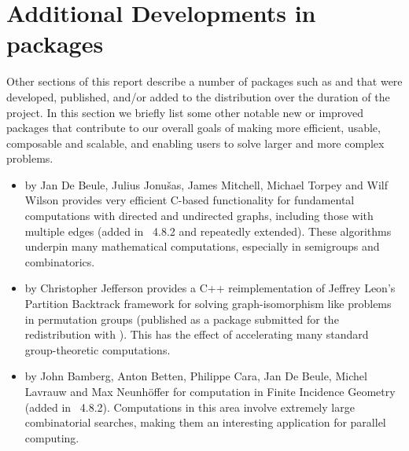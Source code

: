 \section{Additional Developments in \GAP packages} \label{sec:packages}

Other sections of this report describe
a number of \GAP packages such as  and 
that were developed, published,
and/or added to the \GAP distribution over the duration of the project.  In this section
we briefly list some other notable new or improved packages that
contribute to our overall goals of making \GAP more efficient, usable,
composable and scalable, and enabling users to solve larger and more
complex problems.

\begin{itemize}


\item
{} by Jan De Beule, Julius Jonu\v{s}as, James Mitchell,
Michael Torpey and Wilf Wilson \cite{Digraphs} provides very efficient C-based
functionality for fundamental computations with directed and
undirected graphs, including those with multiple edges (added in
\GAP~4.8.2 and repeatedly extended).  These algorithms underpin many
mathematical computations, especially in semigroups and combinatorics.

\item
{} by Christopher Jefferson \cite{ferret} provides a C++
reimplementation of Jeffrey Leon's Partition Backtrack framework for
solving graph-isomorphism like problems in permutation groups
(published as a package submitted for the redistribution with
\GAP). This has the effect of accelerating many standard
group-theoretic computations.

\item
{} by John Bamberg, Anton Betten, Philippe Cara, Jan De
Beule, Michel Lavrauw and Max Neunh\"offer \cite{fining} for computation in Finite
Incidence Geometry (added in \GAP~4.8.2). Computations in this area
involve extremely large combinatorial searches, making them an
interesting application for parallel computing.


\end{itemize}
